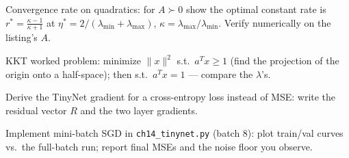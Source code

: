 \begin{exercise}[hard]
Convergence rate on quadratics: for $A\succ0$ show the optimal constant
rate is $r^{*}=\frac{\kappa-1}{\kappa+1}$ at
$\eta^{*}=2/(\lambda_{\min}+\lambda_{\max})$, $\kappa=\lambda_{\max}
/\lambda_{\min}$. Verify numerically on the listing's $A$.
\end{exercise}

\begin{exercise}[hard]
KKT worked problem: minimize $\|x\|^2$ s.t.\ $a^Tx\ge1$ (find the
projection of the origin onto a half-space); then s.t.\ $a^Tx=1$ ---
compare the $\lambda$'s.
\end{exercise}

\begin{exercise}[hard]
Derive the TinyNet gradient for a cross-entropy loss instead of MSE:
write the residual vector $R$ and the two layer gradients.
\end{exercise}

\begin{exercise}[hard]
Implement mini-batch SGD in \texttt{ch14\_tinynet.py} (batch 8): plot
train/val curves vs.\ the full-batch run; report final MSEs and the
noise floor you observe.
\end{exercise}

